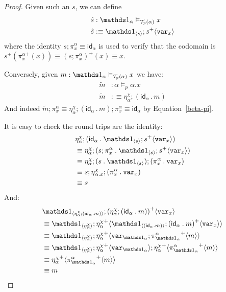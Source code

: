 \documentclass[10pt]{article}
\theoremstyle{definition}
\newcommand{\id}{\mathsf{id}}
\newcommand\TrPlus[2]{\ensuremath{{#1}^+(#2)}}
\newcommand\El[2]{\mathcal{T}_{#1}(#2)}
\newcommand\bdot[0]{\mathbin{.}}
\newcommand\ApPlus[2]{\ensuremath{{#1}^+ \langle #2 \rangle }}
\begin{document}
\begin{proof}
Given such an $s$, we can define
\begin{align*}
\hat{s} &: \One_\alpha \vDash_{\El{p}{\alpha}} x \\
\hat{s} &:\equiv \ApOne{s};\ApPlus{s}{\var{x}}
\end{align*}
where the identity $s;\pi^\alpha_x \equiv \id_\alpha$ is used to verify that the codomain is $\TrPlus{s}{\TrPlus{\pi^\alpha_x}{x}} \equiv \TrPlus{(s;\pi^\alpha_x)}{x} \equiv x$.

Conversely, given $m : \One_\alpha \vDash_{\El{p}{\alpha}} x$ we have:
\begin{align*}
\tilde{m} &: \alpha \vDash_p \alpha.x \\
\tilde{m} &:\equiv \eta^\chi_\alpha ; (\id_\alpha \bdot m)
\end{align*}
And indeed $\tilde{m};\pi^\alpha_x \equiv \eta^\chi_\alpha ; (\id_\alpha \bdot m);\pi^\alpha_x \equiv \id_\alpha$ by Equation~\eqref{beta-pi}.

It is easy to check the round trips are the identity:
\begin{align*}
&\eta^\chi_\alpha ; (\id_\alpha \bdot \ApOne{s};\ApPlus{s}{\var{x}}) \\
&\equiv \eta^\chi_\alpha ; (s;\pi^\alpha_x \bdot \ApOne{s};\ApPlus{s}{\var{x}}) \\
&\equiv \eta^\chi_\alpha ; (s \bdot \ApOne{s});(\pi^\alpha_x \bdot \var{x}) \\
&\equiv s;\eta^\chi_{\alpha.x} ; (\pi^\alpha_x \bdot \var{x}) \\
&\equiv s
\end{align*}
And:
\begin{align*}
&\ApOne{\eta^\chi_\alpha ; (\id_\alpha \bdot m)};\ApPlus{(\eta^\chi_\alpha ; (\id_\alpha \bdot m))}{\var{x}} \\
&\equiv \ApOne{\eta^\chi_\alpha};\ApPlus{\eta^\chi_\alpha}{\ApOne{(\id_\alpha \bdot m)};\ApPlus{(\id_\alpha \bdot m)}{\var{x}}} \\
&\equiv \ApOne{\eta^\chi_\alpha};\ApPlus{\eta^\chi_\alpha}{\var{\One_\alpha};\ApPlus{\pi^\alpha_{\One_\alpha}}{m}} \\
&\equiv \ApOne{\eta^\chi_\alpha};\ApPlus{\eta^\chi_\alpha}{\var{\One_\alpha}};\ApPlus{\eta^\chi_\alpha}{\ApPlus{\pi^\alpha_{\One_\alpha}}{m}} \\
&\equiv \ApPlus{\eta^\chi_\alpha}{\ApPlus{\pi^\alpha_{\One_\alpha}}{m}} \\
&\equiv m
\end{align*}
\end{proof}
\end{document}
